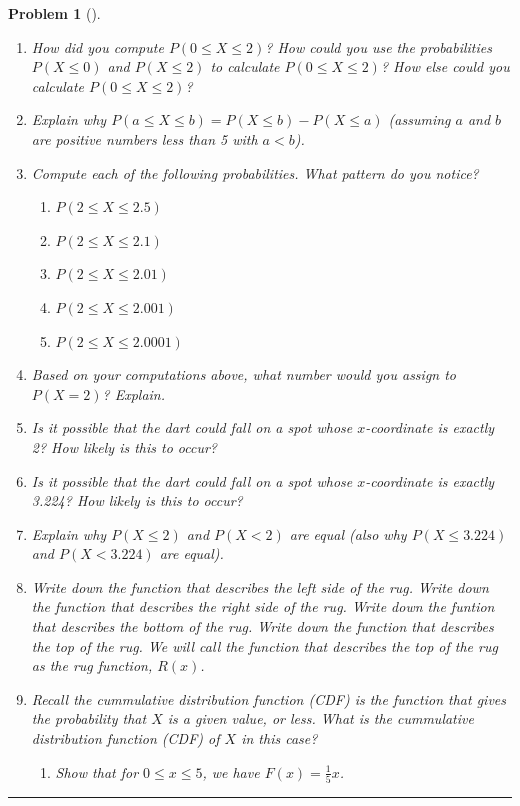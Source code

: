 \documentclass[letterpaper,oneside]{book}%
\theoremstyle{plain}
\theoremstyle{box}
\theoremstyle{problem}
\newtheorem{problemnum}{Problem}[chapter]
\newenvironment{problem}[1][]{\begin{problemnum}[#1]}{\end{problemnum}\nopagebreak\hrule\bigskip}
\begin{document}
\begin{problem}
 \begin{enumerate}
  \item How did you compute $P(0\leq X \leq 2)$? How could you use the probabilities $P(X \leq 0)$ and $P(X \leq 2)$ to calculate $P(0\leq X \leq 2)$? How else could you calculate $P(0 \leq X \leq 2)$?
  \item Explain why $P(a \leq X \leq b) = P(X \leq b)-P(X \leq a)$ (assuming $a$ and $b$ are positive numbers less than 5 with $a<b$).
  \item Compute each of the following probabilities. What pattern do you notice? 
   \begin{enumerate}
    \item $P(2\leq X \leq 2.5)$
    \item $P(2\leq X \leq 2.1)$
    \item $P(2\leq X \leq 2.01)$
    \item $P(2\leq X \leq 2.001)$
    \item $P(2\leq X \leq 2.0001)$
   \end{enumerate}
  \item Based on your computations above, what number would you assign to $P(X=2)$?  Explain.  
  \item Is it possible that the dart could fall on a spot whose $x$-coordinate is exactly 2? How likely is this to occur?
   \item Is it possible that the dart could fall on a spot whose $x$-coordinate is exactly 3.224? How likely is this to occur?
  \item Explain why $P(X\leq 2)$ and $P(X<2)$ are equal (also why $P(X\leq 3.224)$ and $P(X<3.224)$ are equal).
  \item Write down the function that describes the left side of the rug. Write down the function that describes the right side of the rug. Write down the funtion that describes the bottom of the rug. Write down the function that describes the top of the rug. We will call the function that describes the top of the rug as the rug function, $R(x)$.
  \item Recall the cummulative distribution function (CDF) is the function that gives the probability that $X$ is a given value, or less. What is the cummulative distribution function (CDF) of $X$ in this case?
  \begin{enumerate}
   \item Show that for $0\leq x\leq 5$, we have $F(x) = \frac{1}{5}x$.

\end{enumerate}
\end{enumerate}
\end{problem}
\end{document}
